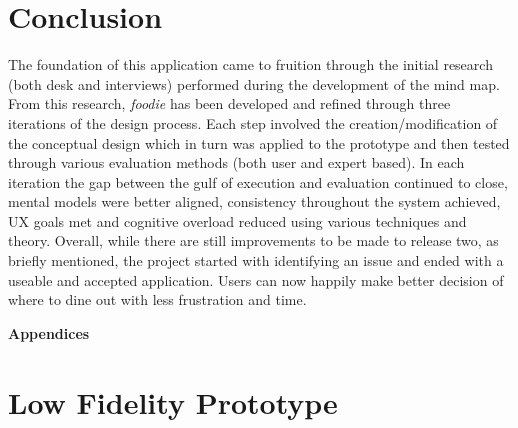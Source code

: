 \documentclass[a4 paper, 12pt]{article}
\begin{document}
\pagebreak
\section{Conclusion}
The foundation of this application came to fruition through the initial research (both desk and interviews) performed during the development of the mind map. From this research, \textit{foodie} has been developed and refined through three iterations of the design process. Each step involved the creation/modification of the conceptual design which in turn was applied to the prototype and then tested through various evaluation methods (both user and expert based). In each iteration the gap between the gulf of execution and evaluation continued to close, mental models were better aligned, consistency throughout the system achieved, UX goals met and cognitive overload reduced using various techniques and theory. Overall, while there are still improvements to be made to release two, as briefly mentioned, the project started with identifying an issue and ended with a useable and accepted application. Users can now happily make better decision of where to dine out with less frustration and time.

\pagebreak





\appendix
\addappheadtotoc

\pagebreak
\begin{center}
    \Huge \textbf{Appendices}
    \section{Low Fidelity Prototype}
\end{center}

    \pagebreak
            
\end{document}
